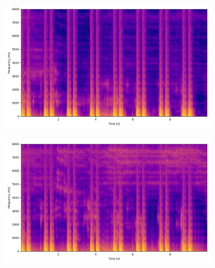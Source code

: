 \begin{figure}[htbp]
\begin{subfigure}[b]{0.18\textwidth}
        \centering
        \includegraphics[width=\textwidth]{plots/onepeace_best_sdr/onepeace sep_spectrogram.png}
    \end{subfigure}
    \begin{subfigure}[b]{0.18\textwidth}
        \centering
        \includegraphics[width=\textwidth]{plots/onepeace_best_sdr/clap sep_spectrogram.png}
    \end{subfigure}
    

\end{figure}
